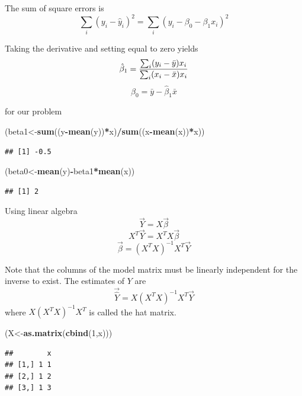 \documentclass[]{book}
\newenvironment{Shaded}{\begin{snugshade}}{\end{snugshade}}
\newcommand{\KeywordTok}[1]{\textcolor[rgb]{0.13,0.29,0.53}{\textbf{#1}}}
\newcommand{\DecValTok}[1]{\textcolor[rgb]{0.00,0.00,0.81}{#1}}
\newcommand{\OperatorTok}[1]{\textcolor[rgb]{0.81,0.36,0.00}{\textbf{#1}}}
\newcommand{\NormalTok}[1]{#1}
\theoremstyle{definition}
\theoremstyle{definition}
\theoremstyle{definition}
\theoremstyle{remark}
\begin{document}
The sum of square errors is
\[\sum_{i}(y_{i}-\hat{y}_{i})^2=\sum_{i}(y_{i}-\beta_{0}-\beta_{1}x_{i})^2\]

Taking the derivative and setting equal to zero yields
\[\hat{\beta}_{1}={\sum_{i} (y_{i}-\bar{y})x_{i} \over \sum_{i} (x_{i}-\bar{x})x_{i}}\]
\[\hat{\beta}_{0}=\bar{y}-\hat{\beta}_{1}\bar{x}\]

for our problem

\begin{Shaded}
\begin{Highlighting}[]
\NormalTok{(beta1<-}\KeywordTok{sum}\NormalTok{((y}\OperatorTok{-}\KeywordTok{mean}\NormalTok{(y))}\OperatorTok{*}\NormalTok{x)}\OperatorTok{/}\KeywordTok{sum}\NormalTok{((x}\OperatorTok{-}\KeywordTok{mean}\NormalTok{(x))}\OperatorTok{*}\NormalTok{x))}
\end{Highlighting}
\end{Shaded}

\begin{verbatim}
## [1] -0.5
\end{verbatim}

\begin{Shaded}
\begin{Highlighting}[]
\NormalTok{(beta0<-}\KeywordTok{mean}\NormalTok{(y)}\OperatorTok{-}\NormalTok{beta1}\OperatorTok{*}\KeywordTok{mean}\NormalTok{(x))}
\end{Highlighting}
\end{Shaded}

\begin{verbatim}
## [1] 2
\end{verbatim}

Using linear algebra \[\vec{Y}=X\vec{\beta}\]
\[X^{T}\vec{Y}=X^{T}X\vec{\beta}\]
\[\vec{\beta}=(X^{T}X)^{-1}X^{T}\vec{Y}\]

Note that the columns of the model matrix must be linearly independent
for the inverse to exist. The estimates of \(Y\) are
\[\vec{\hat{Y}}=X(X^{T}X)^{-1}X^{T}\vec{Y}\] where
\(X(X^{T}X)^{-1}X^{T}\) is called the hat matrix.

\begin{Shaded}
\begin{Highlighting}[]
\NormalTok{(X<-}\KeywordTok{as.matrix}\NormalTok{(}\KeywordTok{cbind}\NormalTok{(}\DecValTok{1}\NormalTok{,x)))}
\end{Highlighting}
\end{Shaded}

\begin{verbatim}
##        x
## [1,] 1 1
## [2,] 1 2
## [3,] 1 3
\end{verbatim}
\end{document}
